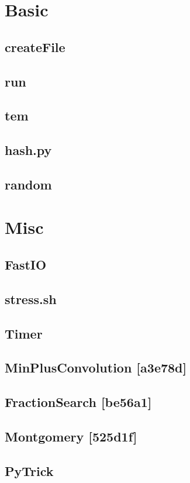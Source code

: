 \documentclass[a4paper,10pt,twocolumn,oneside]{article}
\begin{document}
\pagestyle{fancy}
\fancyfoot{}
\fancyhead[R]{\thepage}
\renewcommand{\headrulewidth}{0.4pt}
\renewcommand{\contentsname}{Contents} 

\scriptsize
\vspace{-2em}
\tableofcontents
\vspace{-1em}



\newcommand{\includecode}[2]{
  \subsection{#1}
  \vspace{-0.8em}
  
  \vspace{-1.2em}
}

\newcommand{\includetex}[2]{
  \subsection{#1}
  
  \vspace{-1.2em}
}

\newcommand{\sectiontitle}[1]{
  \section{#1}
  \vspace{-0.5em}
}



\sectiontitle{Basic}
\includecode{createFile}{../code/Basic/createFile}
\includecode{run}{../code/Basic/run}
\includecode{tem}{../code/Basic/tem.cpp}
\includecode{hash.py}{../code/Basic/hash.py}
\includecode{random}{../code/Basic/random.cpp}

\sectiontitle{Misc}
\includecode{FastIO}{../code/Misc/FastIO.cpp}
\includecode{stress.sh}{../code/Misc/stress.sh}
\includecode{Timer}{../code/Misc/Timer.cpp}
\includecode{MinPlusConvolution [a3e78d]}{../code/Misc/Min_Plus_Convolution.cpp}
\includecode{FractionSearch [be56a1]}{../code/Misc/FractionSearch.cpp}
\includecode{Montgomery [525d1f]}{../code/Misc/Montgomery.cpp}
\includecode{PyTrick}{../code/Misc/PyTrick.py}
\end{document}
